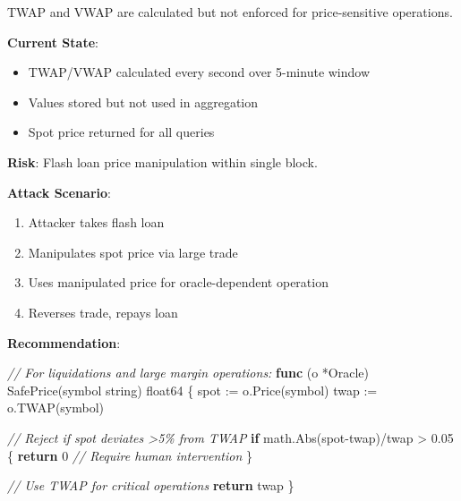 \documentclass[
]{article}
\newenvironment{Shaded}{}{}
\newcommand{\CommentTok}[1]{\textcolor[rgb]{0.38,0.63,0.69}{\textit{#1}}}
\newcommand{\ControlFlowTok}[1]{\textcolor[rgb]{0.00,0.44,0.13}{\textbf{#1}}}
\newcommand{\DataTypeTok}[1]{\textcolor[rgb]{0.56,0.13,0.00}{#1}}
\newcommand{\DecValTok}[1]{\textcolor[rgb]{0.25,0.63,0.44}{#1}}
\newcommand{\FloatTok}[1]{\textcolor[rgb]{0.25,0.63,0.44}{#1}}
\newcommand{\KeywordTok}[1]{\textcolor[rgb]{0.00,0.44,0.13}{\textbf{#1}}}
\newcommand{\NormalTok}[1]{#1}
\newcommand{\OperatorTok}[1]{\textcolor[rgb]{0.40,0.40,0.40}{#1}}
\providecommand{\tightlist}{%
  \setlength{\itemsep}{0pt}\setlength{\parskip}{0pt}}
\begin{document}
TWAP and VWAP are calculated but not enforced for price-sensitive
operations.

\textbf{Current State}:

\begin{itemize}
\tightlist
\item
  TWAP/VWAP calculated every second over 5-minute window
\item
  Values stored but not used in aggregation
\item
  Spot price returned for all queries
\end{itemize}

\textbf{Risk}: Flash loan price manipulation within single block.

\textbf{Attack Scenario}:

\begin{enumerate}
\def\labelenumi{\arabic{enumi}.}
\tightlist
\item
  Attacker takes flash loan
\item
  Manipulates spot price via large trade
\item
  Uses manipulated price for oracle-dependent operation
\item
  Reverses trade, repays loan
\end{enumerate}

\textbf{Recommendation}:

\begin{Shaded}
\begin{Highlighting}[]
\CommentTok{// For liquidations and large margin operations:}
\KeywordTok{func} \OperatorTok{(}\NormalTok{o }\OperatorTok{*}\NormalTok{Oracle}\OperatorTok{)}\NormalTok{ SafePrice}\OperatorTok{(}\NormalTok{symbol }\DataTypeTok{string}\OperatorTok{)} \DataTypeTok{float64} \OperatorTok{\{}
\NormalTok{    spot }\OperatorTok{:=}\NormalTok{ o}\OperatorTok{.}\NormalTok{Price}\OperatorTok{(}\NormalTok{symbol}\OperatorTok{)}
\NormalTok{    twap }\OperatorTok{:=}\NormalTok{ o}\OperatorTok{.}\NormalTok{TWAP}\OperatorTok{(}\NormalTok{symbol}\OperatorTok{)}
    
    \CommentTok{// Reject if spot deviates \textgreater{}5\% from TWAP}
    \ControlFlowTok{if}\NormalTok{ math}\OperatorTok{.}\NormalTok{Abs}\OperatorTok{(}\NormalTok{spot}\OperatorTok{{-}}\NormalTok{twap}\OperatorTok{)/}\NormalTok{twap }\OperatorTok{\textgreater{}} \FloatTok{0.05} \OperatorTok{\{}
        \ControlFlowTok{return} \DecValTok{0} \CommentTok{// Require human intervention}
    \OperatorTok{\}}
    
    \CommentTok{// Use TWAP for critical operations}
    \ControlFlowTok{return}\NormalTok{ twap}
\OperatorTok{\}}
\end{Highlighting}
\end{Shaded}
\end{document}
